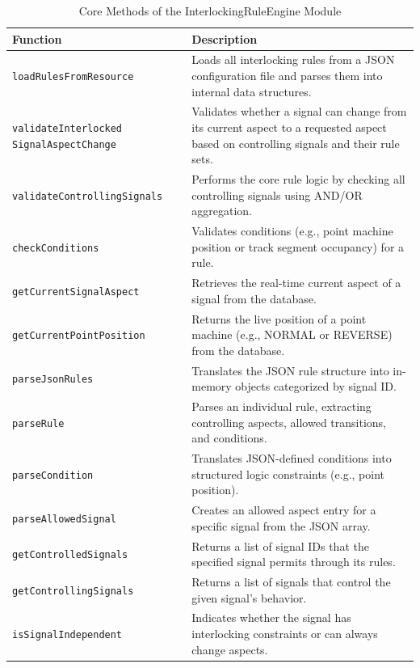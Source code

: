 \begin{table}[H]
    \centering
    \renewcommand{\arraystretch}{1.3}
    \caption{Core Methods of the InterlockingRuleEngine Module}
    \begin{tabular}{p{5.2cm} p{10.2cm}}
        \toprule
        \textbf{Function} & \textbf{Description} \\
        \midrule
        \texttt{loadRulesFromResource} & Loads all interlocking rules from a JSON configuration file and parses them into internal data structures. \\
        \texttt{validateInterlocked \newline SignalAspectChange} & Validates whether a signal can change from its current aspect to a requested aspect based on controlling signals and their rule sets. \\
        \texttt{validateControllingSignals} & Performs the core rule logic by checking all controlling signals using AND/OR aggregation. \\
        \texttt{checkConditions} & Validates conditions (e.g., point machine position or track segment occupancy) for a rule. \\
        \texttt{getCurrentSignalAspect} & Retrieves the real-time current aspect of a signal from the database. \\
        \texttt{getCurrentPointPosition} & Returns the live position of a point machine (e.g., NORMAL or REVERSE) from the database. \\
        \texttt{parseJsonRules} & Translates the JSON rule structure into in-memory objects categorized by signal ID. \\
        \texttt{parseRule} & Parses an individual rule, extracting controlling aspects, allowed transitions, and conditions. \\
        \texttt{parseCondition} & Translates JSON-defined conditions into structured logic constraints (e.g., point position). \\
        \texttt{parseAllowedSignal} & Creates an allowed aspect entry for a specific signal from the JSON array. \\
        \texttt{getControlledSignals} & Returns a list of signal IDs that the specified signal permits through its rules. \\
        \texttt{getControllingSignals} & Returns a list of signals that control the given signal’s behavior. \\
        \texttt{isSignalIndependent} & Indicates whether the signal has interlocking constraints or can always change aspects. \\
        \bottomrule
    \end{tabular}
    \label{tab:interlocking-rule-engine-methods}
\end{table}
